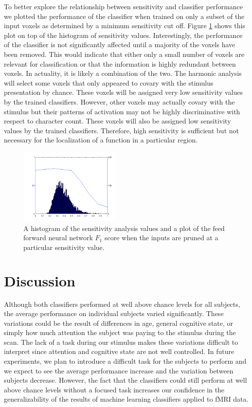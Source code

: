 \documentclass[preprint,5p,authoryear]{elsarticle}
\begin{document}
To better explore the relationship between sensitivity and classifier performance we plotted the performance of the classifier when trained on only a subset of the input voxels as determined by a minimum sensitivity cut off.
Figure \ref{fig:sensitivity-cutoff} shows this plot on top of the histogram of sensitivity values.
Interestingly, the performance of the classifier is not significantly affected until a majority of the voxels have been removed.
This would indicate that either only a small number of voxels are relevant for classification or that the information is highly redundant between voxels.
In actuality, it is likely a combination of the two.
The harmonic analysis will select some voxels that only appeared to covary with the stimulus presentation by chance.
These voxels will be assigned very low sensitivity values by the trained classifiers.
However, other voxels may actually covary with the stimulus but their patterns of activation may not be highly discriminative with respect to character count.
These voxels will also be assigned low sensitivity values by the trained classifiers.
Therefore, high sensitivity is sufficient but not necessary for the localization of a function in a particular region.

\begin{figure}
\centering
\includegraphics[width=0.45\textwidth]{figures/sensitivity-cutoff}
\caption{A histogram of the sensitivity analysis values and a plot of the feed forward neural network $F_1$ score when the inputs are pruned at a particular sensitivity value. }
\label{fig:sensitivity-cutoff}
\end{figure}

\section{Discussion}
Although both classifiers performed at well above chance levels for all subjects, the average performance on individual subjects varied significantly.
These variations could be the result of differences in age, general cognitive state, or simply how much attention the subject was paying to the stimulus during the scan.
The lack of a task during our stimulus makes these variations difficult to interpret since attention and cognitive state are not well controlled.
In future experiments, we plan to introduce a difficult task for the subjects to perform and we expect to see the average performance increase and the variation between subjects decrease.
However, the fact that the classifiers could still perform at well above chance levels without a focused task increases our confidence in the generalizability of the results of machine learning classifiers applied to fMRI data.
\end{document}
